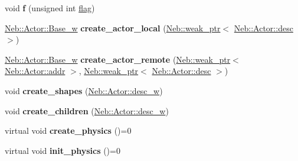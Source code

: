 \begin{DoxyCompactItemize}
\item 
\hypertarget{classNeb_1_1Actor_1_1Base_a400c04ba14166e7e399630c576f626eb}{void {\bfseries f} (unsigned int \hyperlink{structNeb_1_1Actor_1_1Base_1_1flag}{flag})}\label{classNeb_1_1Actor_1_1Base_a400c04ba14166e7e399630c576f626eb}

\item 
\hypertarget{classNeb_1_1Actor_1_1Base_a33d8f4f168d856b7df8f2eb2e1aaf4ab}{\hyperlink{classNeb_1_1weak__ptr}{\-Neb\-::\-Actor\-::\-Base\-\_\-w} {\bfseries create\-\_\-actor\-\_\-local} (\hyperlink{classNeb_1_1weak__ptr}{\-Neb\-::weak\-\_\-ptr}$<$ \hyperlink{classNeb_1_1Actor_1_1desc}{\-Neb\-::\-Actor\-::desc} $>$)}\label{classNeb_1_1Actor_1_1Base_a33d8f4f168d856b7df8f2eb2e1aaf4ab}

\item 
\hypertarget{classNeb_1_1Actor_1_1Base_aec51ecb6db10f5153e3b50c8d0861766}{\hyperlink{classNeb_1_1weak__ptr}{\-Neb\-::\-Actor\-::\-Base\-\_\-w} {\bfseries create\-\_\-actor\-\_\-remote} (\hyperlink{classNeb_1_1weak__ptr}{\-Neb\-::weak\-\_\-ptr}$<$ \hyperlink{classNeb_1_1Actor_1_1addr}{\-Neb\-::\-Actor\-::addr} $>$, \hyperlink{classNeb_1_1weak__ptr}{\-Neb\-::weak\-\_\-ptr}$<$ \hyperlink{classNeb_1_1Actor_1_1desc}{\-Neb\-::\-Actor\-::desc} $>$)}\label{classNeb_1_1Actor_1_1Base_aec51ecb6db10f5153e3b50c8d0861766}

\item 
\hypertarget{classNeb_1_1Actor_1_1Base_ad0f6b524ce7d6460ccc27ad46096d7c7}{void {\bfseries create\-\_\-shapes} (\hyperlink{classNeb_1_1weak__ptr}{\-Neb\-::\-Actor\-::desc\-\_\-w})}\label{classNeb_1_1Actor_1_1Base_ad0f6b524ce7d6460ccc27ad46096d7c7}

\item 
\hypertarget{classNeb_1_1Actor_1_1Base_ad3b0ddc05b832644eb0cfe67dd6bb5f2}{void {\bfseries create\-\_\-children} (\hyperlink{classNeb_1_1weak__ptr}{\-Neb\-::\-Actor\-::desc\-\_\-w})}\label{classNeb_1_1Actor_1_1Base_ad3b0ddc05b832644eb0cfe67dd6bb5f2}

\item 
\hypertarget{classNeb_1_1Actor_1_1Base_ae5649ec4e6bae0235f5056f8ef877f6e}{virtual void {\bfseries create\-\_\-physics} ()=0}\label{classNeb_1_1Actor_1_1Base_ae5649ec4e6bae0235f5056f8ef877f6e}

\item 
\hypertarget{classNeb_1_1Actor_1_1Base_a84a52d4a51117c510336bcad075f63d1}{virtual void {\bfseries init\-\_\-physics} ()=0}\label{classNeb_1_1Actor_1_1Base_a84a52d4a51117c510336bcad075f63d1}


\end{DoxyCompactItemize}
